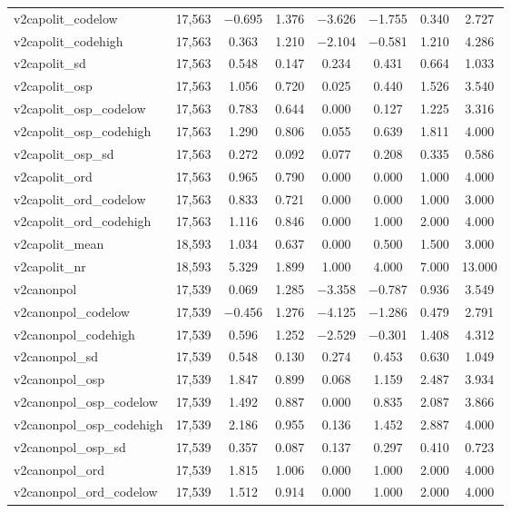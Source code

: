 \begin{table}[!htbp]
\begin{tabular}{@{\extracolsep{5pt}}lccccccc}
v2capolit\_codelow & 17,563 & $-$0.695 & 1.376 & $-$3.626 & $-$1.755 & 0.340 & 2.727 \\ 
v2capolit\_codehigh & 17,563 & 0.363 & 1.210 & $-$2.104 & $-$0.581 & 1.210 & 4.286 \\ 
v2capolit\_sd & 17,563 & 0.548 & 0.147 & 0.234 & 0.431 & 0.664 & 1.033 \\ 
v2capolit\_osp & 17,563 & 1.056 & 0.720 & 0.025 & 0.440 & 1.526 & 3.540 \\ 
v2capolit\_osp\_codelow & 17,563 & 0.783 & 0.644 & 0.000 & 0.127 & 1.225 & 3.316 \\ 
v2capolit\_osp\_codehigh & 17,563 & 1.290 & 0.806 & 0.055 & 0.639 & 1.811 & 4.000 \\ 
v2capolit\_osp\_sd & 17,563 & 0.272 & 0.092 & 0.077 & 0.208 & 0.335 & 0.586 \\ 
v2capolit\_ord & 17,563 & 0.965 & 0.790 & 0.000 & 0.000 & 1.000 & 4.000 \\ 
v2capolit\_ord\_codelow & 17,563 & 0.833 & 0.721 & 0.000 & 0.000 & 1.000 & 3.000 \\ 
v2capolit\_ord\_codehigh & 17,563 & 1.116 & 0.846 & 0.000 & 1.000 & 2.000 & 4.000 \\ 
v2capolit\_mean & 18,593 & 1.034 & 0.637 & 0.000 & 0.500 & 1.500 & 3.000 \\ 
v2capolit\_nr & 18,593 & 5.329 & 1.899 & 1.000 & 4.000 & 7.000 & 13.000 \\ 
v2canonpol & 17,539 & 0.069 & 1.285 & $-$3.358 & $-$0.787 & 0.936 & 3.549 \\ 
v2canonpol\_codelow & 17,539 & $-$0.456 & 1.276 & $-$4.125 & $-$1.286 & 0.479 & 2.791 \\ 
v2canonpol\_codehigh & 17,539 & 0.596 & 1.252 & $-$2.529 & $-$0.301 & 1.408 & 4.312 \\ 
v2canonpol\_sd & 17,539 & 0.548 & 0.130 & 0.274 & 0.453 & 0.630 & 1.049 \\ 
v2canonpol\_osp & 17,539 & 1.847 & 0.899 & 0.068 & 1.159 & 2.487 & 3.934 \\ 
v2canonpol\_osp\_codelow & 17,539 & 1.492 & 0.887 & 0.000 & 0.835 & 2.087 & 3.866 \\ 
v2canonpol\_osp\_codehigh & 17,539 & 2.186 & 0.955 & 0.136 & 1.452 & 2.887 & 4.000 \\ 
v2canonpol\_osp\_sd & 17,539 & 0.357 & 0.087 & 0.137 & 0.297 & 0.410 & 0.723 \\ 
v2canonpol\_ord & 17,539 & 1.815 & 1.006 & 0.000 & 1.000 & 2.000 & 4.000 \\ 
v2canonpol\_ord\_codelow & 17,539 & 1.512 & 0.914 & 0.000 & 1.000 & 2.000 & 4.000 \\ 

\end{tabular}
\end{table}

